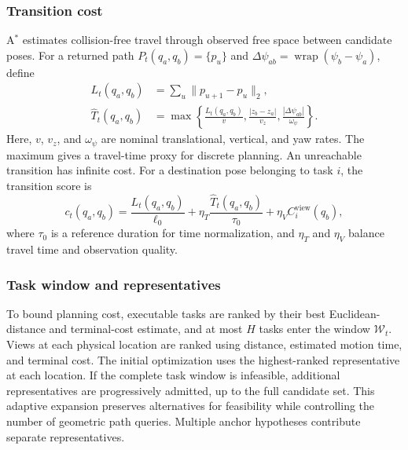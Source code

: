 \documentclass[letterpaper,10pt,journal]{IEEEtran}
\begin{document}
\subsubsection{Transition cost}
A$^*$ estimates collision-free travel through observed free space between candidate poses. For a returned path $P_t(q_a,q_b)=\{p_u\}$ and $\Delta\psi_{ab}=\operatorname{wrap}(\psi_b-\psi_a)$, define
\begin{equation}
\begin{aligned}
L_t(q_a,q_b)&=\sum_u\|p_{u+1}-p_u\|_2,\\
\widehat T_t(q_a,q_b)&=\max\left\{
\frac{L_t(q_a,q_b)}{v},\frac{|z_b-z_a|}{v_z},
\frac{|\Delta\psi_{ab}|}{\omega_\psi}\right\}.
\end{aligned}
\label{eq:motion-cost}
\end{equation}
Here, $v$, $v_z$, and $\omega_\psi$ are nominal translational, vertical, and yaw rates. The maximum gives a travel-time proxy for discrete planning. An unreachable transition has infinite cost. For a destination pose belonging to task $i$, the transition score is
\begin{equation}
c_t(q_a,q_b)=\frac{L_t(q_a,q_b)}{\ell_0}
+\eta_T\frac{\widehat T_t(q_a,q_b)}{\tau_0}
+\eta_V C_i^{\mathrm{view}}(q_b),
\label{eq:transition-score}
\end{equation}
where $\tau_0$ is a reference duration for time normalization, and $\eta_T$ and $\eta_V$ balance travel time and observation quality.

\subsubsection{Task window and representatives}
To bound planning cost, executable tasks are ranked by their best Euclidean-distance and terminal-cost estimate, and at most $H$ tasks enter the window $\mathcal W_t$. Views at each physical location are ranked using distance, estimated motion time, and terminal cost. The initial optimization uses the highest-ranked representative at each location. If the complete task window is infeasible, additional representatives are progressively admitted, up to the full candidate set. This adaptive expansion preserves alternatives for feasibility while controlling the number of geometric path queries. Multiple anchor hypotheses contribute separate representatives.
\end{document}
